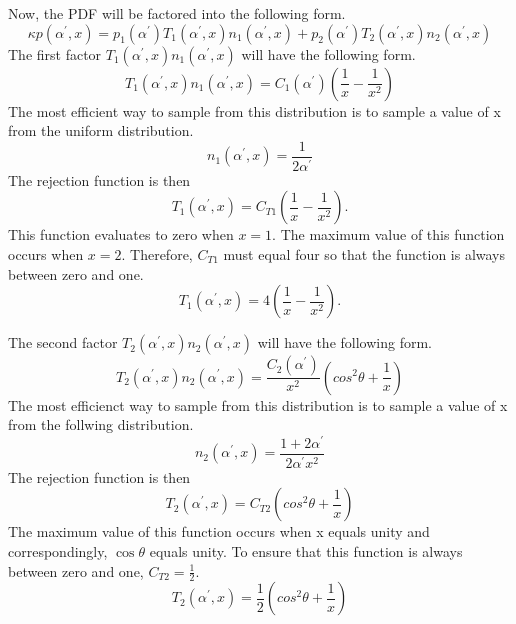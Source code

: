 Now, the PDF will be factored into the following form.
\begin{equation*}
  \kappa p(\alpha^{'},x) = p_1(\alpha^{'})T_1(\alpha^{'},x)n_1(\alpha^{'},x) + 
  p_2(\alpha^{'})T_2(\alpha^{'},x)n_2(\alpha^{'},x)
\end{equation*}
The first factor $T_1(\alpha^{'},x)n_1(\alpha^{'},x)$ will have the following 
form.
\begin{equation*}
  T_1(\alpha^{'},x)n_1(\alpha^{'},x) = C_1(\alpha^{'})\left(\frac{1}{x} - 
  \frac{1}{x^2}\right)
\end{equation*}
The most efficient way to sample from this distribution is to sample a value
of x from the uniform distribution.
\begin{equation}
  n_1(\alpha^{'},x) = \frac{1}{2\alpha^{'}}
\end{equation}
The rejection function is then
\begin{equation*}
  T_1(\alpha^{'},x) = C_{T1}\left(\frac{1}{x} - \frac{1}{x^2}\right).
\end{equation*}
This function evaluates to zero when $x = 1$. The maximum value of this function
occurs when $x = 2$. Therefore, $C_{T1}$ must equal four so that the function
is always between zero and one.
\begin{equation}
  T_1(\alpha^{'},x) = 4\left(\frac{1}{x} - \frac{1}{x^2}\right).
\end{equation}

The second factor $T_2(\alpha^{'},x)n_2(\alpha^{'},x)$ will have the following 
form.
\begin{equation*}
  T_2(\alpha^{'},x)n_2(\alpha^{'},x) = \frac{C_2(\alpha^{'})}{x^2}
  \left(cos^2\theta + \frac{1}{x}\right)
\end{equation*}
The most efficienct way to sample from this distribution is to sample a value
of x from the follwing distribution.
\begin{equation}
  n_2(\alpha^{'},x) = \frac{1+2\alpha^{'}}{2\alpha^{'} x^2}
\end{equation}
The rejection function is then
\begin{equation*}
  T_2(\alpha^{'},x) = C_{T2}\left(cos^2\theta + \frac{1}{x} \right)
\end{equation*}
The maximum value of this function occurs when x equals unity and 
correspondingly, $\cos{\theta}$ equals unity. To ensure that this function is
always between zero and one, $C_{T2} = \frac{1}{2}$.
\begin{equation}
  T_2(\alpha^{'},x) = \frac{1}{2}\left(cos^2\theta + \frac{1}{x} \right)
\end{equation}

